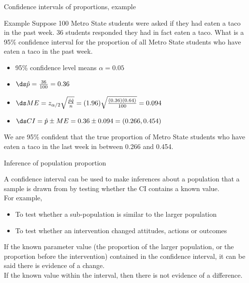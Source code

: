 \documentclass[xcolor=table]{beamer}
\begin{document}
\begin{frame}{Confidence intervals of proportions, example}
\begin{exampleblock}{Example}
\large
Suppose 100 Metro State students were asked if they had eaten a taco in the past week. 36 students responded they had in fact eaten a taco. What is a 95\% confidence interval for the proportion of all Metro State students who have eaten a taco in the past week.
\begin{itemize}
\pause\item 95\% confidence level means $\alpha = 0.05$
\pause\item $\ds \hat p = \frac {36}{100} = 0.36$
\pause\item $\ds ME = z_{\alpha/2}\sqrt{\frac {\hat p \hat q}{n}} = (1.96)\sqrt{\frac {(0.36)(0.64)}{100}} = 0.094$
\pause\item $\ds CI = \hat p \pm ME = 0.36 \pm 0.094 = (0.266, 0.454)$
\end{itemize}
\pause We are 95\% confident that the true proportion of Metro State students who have eaten a taco in the last week in between 0.266 and 0.454.
\end{exampleblock}
\end{frame}


\begin{frame}{Inference of population proportion}
\begin{block}{}
\large
A confidence interval can be used to make inferences about a population that a sample is drawn from by testing whether the CI contains a known value.\\
\pause\medskip
For example,
\begin{itemize}
\item To test whether a sub-population is similar to the larger population
\item To test whether an intervention changed attitudes, actions or outcomes
\end{itemize}

\pause If the known parameter value (the proportion of the larger population, or the proportion before the intervention)  contained in the confidence interval, it can be said there is evidence of a change.\\
\medskip
If the known value  within the interval, then there is not evidence of a difference.
\end{block}
\end{frame}
\end{document}
